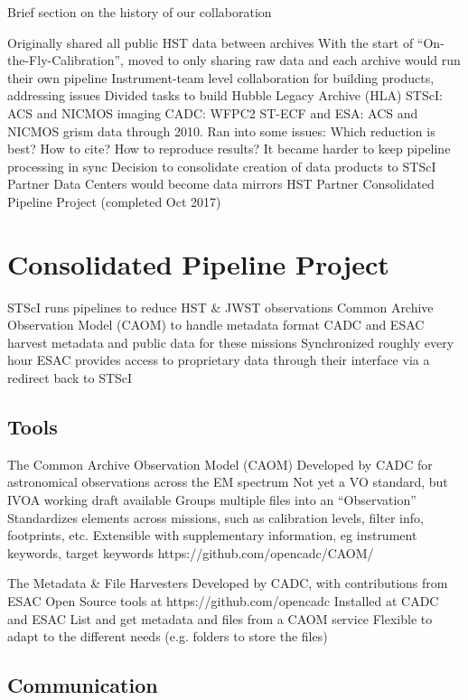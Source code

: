 \documentclass[11pt,twoside]{article}
\begin{document}
Brief section on the history of our collaboration

Originally shared all public HST data between archives
With the start of “On-the-Fly-Calibration”, moved to only sharing raw data and each archive would run their own pipeline
Instrument-team level collaboration for building products, addressing issues
Divided tasks to build Hubble Legacy Archive (HLA)
STScI: ACS and NICMOS imaging
CADC: WFPC2
ST-ECF and ESA: ACS and NICMOS grism data through 2010. 
Ran into some issues:
Which reduction is best? How to cite? How to reproduce results?
It became harder to keep pipeline processing in sync
Decision to consolidate creation of data products to STScI
Partner Data Centers would become data mirrors
HST Partner Consolidated Pipeline Project  (completed Oct 2017)

\section{Consolidated Pipeline Project}


STScI runs pipelines to reduce HST & JWST observations
Common Archive Observation Model (CAOM) to handle metadata format
CADC and ESAC harvest metadata and public data for these missions
Synchronized roughly every hour
ESAC provides access to proprietary data through their interface via a redirect back to STScI

\subsection{Tools}

The Common Archive Observation Model (CAOM)
Developed by CADC for astronomical observations across the EM spectrum
Not yet a VO standard, but IVOA working draft available
Groups multiple files into an “Observation”
Standardizes elements across missions, such as calibration levels, filter info, footprints, etc.
Extensible with supplementary information, eg instrument keywords, target keywords
https://github.com/opencadc/CAOM/

The Metadata & File Harvesters
Developed by CADC, with contributions from ESAC
Open Source tools at https://github.com/opencadc 
Installed at CADC and ESAC
List and get metadata and files from a CAOM service
Flexible to adapt to the different needs (e.g. folders to store the files)

\subsection{Communication}
\end{document}
